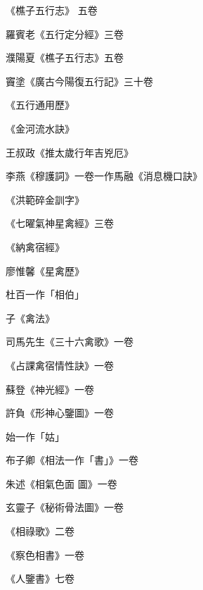 \begin{pinyinscope}
 《樵子五行志》
 五卷



 羅賓老《五行定分經》三卷



 濮陽夏《樵子五行志》五卷



 竇塗《廣古今陽復五行記》三十卷



 《五行通用歷》



 《金河流水訣》



 王叔政《推太歲行年吉兇厄》



 李燕《穆護詞》一卷一作馬融《消息機口訣》



 《洪範碎金訓字》



 《七曜氣神星禽經》三卷



 《納禽宿經》



 廖惟馨《星禽歷》



 杜百一作「相伯」



 子《禽法》



 司馬先生《三十六禽歌》一卷



 《占課禽宿情性訣》一卷



 蘇登《神光經》一卷



 許負《形神心鑒圖》一卷



 始一作「姑」



 布子卿《相法一作「書」》一卷



 朱述《相氣色面
 圖》一卷



 玄靈子《秘術骨法圖》一卷



 《相祿歌》二卷



 《察色相書》一卷



 《人鑒書》七卷




\end{pinyinscope}
